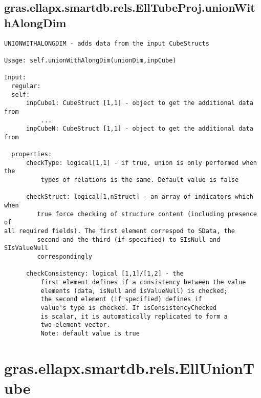 \subsection{\texorpdfstring{gras.ellapx.smartdb.rels.EllTubeProj.unionWithAlongDim}{unionWithAlongDim}}\label{method:gras.ellapx.smartdb.rels.EllTubeProj.unionWithAlongDim}
\begin{verbatim}
UNIONWITHALONGDIM - adds data from the input CubeStructs

Usage: self.unionWithAlongDim(unionDim,inpCube)

Input:
  regular:
  self:
      inpCube1: CubeStruct [1,1] - object to get the additional data from
          ...
      inpCubeN: CubeStruct [1,1] - object to get the additional data from

  properties:
      checkType: logical[1,1] - if true, union is only performed when the
          types of relations is the same. Default value is false

      checkStruct: logical[1,nStruct] - an array of indicators which when
         true force checking of structure content (including presence of
all required fields). The first element correspod to SData, the
         second and the third (if specified) to SIsNull and SIsValueNull
         correspondingly

      checkConsistency: logical [1,1]/[1,2] - the
          first element defines if a consistency between the value
          elements (data, isNull and isValueNull) is checked;
          the second element (if specified) defines if
          value's type is checked. If isConsistencyChecked
          is scalar, it is automatically replicated to form a
          two-element vector.
          Note: default value is true
\end{verbatim}
\section{gras.ellapx.smartdb.rels.EllUnionTube}\label{secClassDescr:gras.ellapx.smartdb.rels.EllUnionTube}
